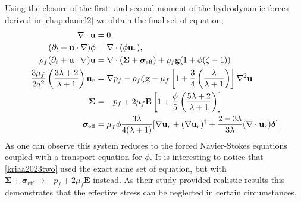 Using the closure of the first- and second-moment of the hydrodynamic forces derived in \ref{chap:daniel2} we obtain the final set of equation, 
\begin{align}
    \mathbf{\nabla}\cdot\textbf{u}&=0, \\
    (\partial_t + \textbf{u}\cdot \mathbf{\nabla})\phi &= \mathbf{\nabla}\cdot(\phi \textbf{u}_r), \\
    \rho_f (\partial_t 
    + \textbf{u}\cdot \mathbf{\nabla})
    \textbf{u}
    &= 
    \mathbf{\nabla}\cdot (\bm\Sigma + \bm{\sigma}_\text{eff})
    + \rho_f \textbf{g} (1 + \phi(\zeta-1) )\\
    \frac{3\mu_f}{2 a^2}\left(\frac{3\lambda+2}{\lambda+1}\right)
   \textbf{u}_{r} 
    &= 
    \mathbf{\nabla} p_f
    - \rho_f\zeta   \textbf{g}
    -  \mu_f \left[
        1 + \frac{3}{4} \left(\frac{\lambda}{\lambda+1}\right)
        \right]\mathbf{\nabla}^2 \textbf{u}
    \\
    \bm\Sigma& = 
    - p_f +2\mu_f  \textbf{E} \left[1 + \frac{\phi}{5}\left(\frac{5\lambda +2}{\lambda +1}\right)\right] \\
    \bm\sigma_\text{eff} &= \mu_f \phi      
    \frac{3\lambda}{4(\lambda + 1)}[\mathbf{\nabla} \textbf{u}_{r} +(\mathbf{\nabla} \textbf{u}_{r})^\dagger +\frac{2-3\lambda}{3\lambda}(\mathbf{\nabla}\cdot  \textbf{u}_{r})\bm\delta] 
\end{align}
As one can observe this system reduces to the forced Navier-Stokes equations coupled with a transport equation for $\phi$. 
It is interesting to notice that \ref{kriaa2023two} used the exact same set of equation, but with $\bm\Sigma + \bm\sigma_\text{eff} \to -p_f +2 \mu_f \textbf{E}$ instead. 
As their study provided realistic results this demonstrates that the effective stress can be neglected in certain circumstances. 




